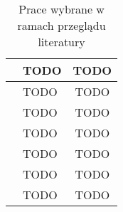 \begin{table}[h!]
\begin{tabular}{|c|l|c|}
    \hline
    \cite{9027427} & TODO & TODO \\
    \hline
    \cite{8513710} & TODO & TODO \\
    \hline
    \cite{Cavalheiro202389} & TODO & TODO \\
    \hline
    \cite{raza2021sok} & TODO & TODO \\
    \hline
    \cite{LEITNER2019340} & TODO & TODO \\
    \hline
    \cite{eismann2021reviewserverlessusecases} & TODO & TODO \\
    \hline
    \cite{Ivanov_Petrova_2024} & TODO & TODO \\
    \hline
    \end{tabular}
    \caption{Prace wybrane w ramach przeglądu literatury}
\end{table}
